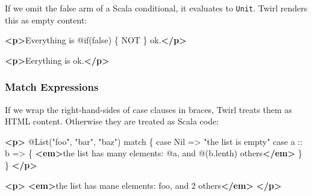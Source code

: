 \documentclass[oneside,11pt,a4paper,]{book}
\newenvironment{Shaded}{\begin{snugshade}}{\end{snugshade}}
\newcommand{\KeywordTok}[1]{\textcolor[rgb]{0.13,0.29,0.53}{\textbf{{#1}}}}
\newcommand{\NormalTok}[1]{{#1}}
\begin{document}
If we omit the false arm of a Scala conditional, it evaluates to
\texttt{Unit}. Twirl renders this as empty content:

\begin{multicols}{2}

\begin{Shaded}
\begin{Highlighting}[]
\KeywordTok{<p>}\NormalTok{Everything is @if(false) \{ NOT \} ok.}\KeywordTok{</p>}
\end{Highlighting}
\end{Shaded}

\columnbreak

\begin{Shaded}
\begin{Highlighting}[]
\KeywordTok{<p>}\NormalTok{Eerything is  ok.}\KeywordTok{</p>}
\end{Highlighting}
\end{Shaded}

\end{multicols}

\subsubsection{Match Expressions}\label{match-expressions}

If we wrap the right-hand-sides of case clauses in braces, Twirl treats
them as HTML content. Otherwise they are treated as Scala code:

\begin{multicols}{2}

\begin{Shaded}
\begin{Highlighting}[]
\KeywordTok{<p>}
  \NormalTok{@List("foo", "bar", "baz") match \{}
    \NormalTok{case Nil => "the list is empty"}
    \NormalTok{case a :: b => \{}
      \KeywordTok{<em>}\NormalTok{the list has many elements:}
      \NormalTok{@a, and @(b.lenth) others}\KeywordTok{</em>}
    \NormalTok{\}}
  \NormalTok{\}}
\KeywordTok{</p>}
\end{Highlighting}
\end{Shaded}

\columnbreak

\begin{Shaded}
\begin{Highlighting}[]
\KeywordTok{<p>}
  \KeywordTok{<em>}\NormalTok{the list has mane elements:}
  \NormalTok{foo, and 2 others}\KeywordTok{</em>}
\KeywordTok{</p>}
\end{Highlighting}
\end{Shaded}

\end{multicols}
\end{document}
